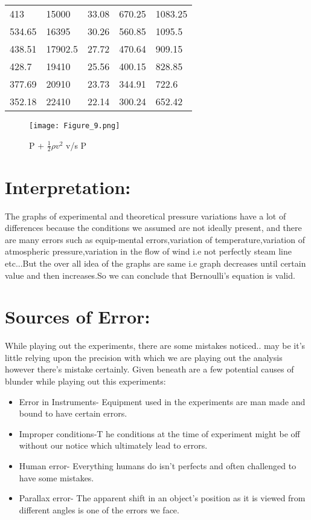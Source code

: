 \documentclass[12pt,a4paper]{article}
\begin{document}
\begin{itemize}
\begin{table}
\begin{center}
\begin{tabular}{|p{5cm}|p{3cm}|p{2.5cm}|p{2.5cm}|p{2.5cm}|}
413 &15000 &33.08 &670.25 &1083.25\\
534.65 &16395 &30.26 &560.85 &1095.5\\
438.51 &17902.5 &27.72 &470.64 &909.15\\
428.7 &19410 &25.56 &400.15 &828.85\\
377.69 &20910 &23.73 &344.91 &722.6\\
352.18 &22410 &22.14 &300.24 &652.42\\
\hline
\end{tabular}
\end{center}
\end{table}
\begin{figure}[!ht]
	\begin{center}
			\texttt{[image: Figure\_9.png]}
	\end{center}
	\caption{P + $\frac{1}{2} \rho v^2$ v/s P}
\end{figure}
\end{itemize}
\section{Interpretation:}
The graphs of experimental and theoretical pressure variations have a lot of differences because the conditions we assumed are not ideally present, and there are many errors such as equip-mental errors,variation of temperature,variation of atmospheric pressure,variation in the flow of wind i.e not perfectly steam line etc...But the over all idea of the graphs are same i.e graph decreases until certain value and then increases.So we can conclude that Bernoulli’s equation is valid.
\section{Sources of Error:}
While playing out the experiments, there are some mistakes noticed.. may be it’s little relying upon the precision with which we are playing out the analysis however there’s mistake certainly. Given beneath are a few potential causes of blunder while playing out this experiments:
\begin{itemize}
\item Error in Instruments- Equipment used in the experiments are man made and bound to have certain errors.
\item Improper conditions-T he conditions at the time of experiment might be off without our notice which ultimately lead to errors.
\item Human error- Everything humans do isn’t perfects and often challenged to have some mistakes.
\item Parallax error- The apparent shift in an object’s position as it is viewed from different angles is one of the errors we face.
\end{itemize}
\end{document}
